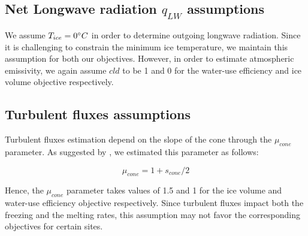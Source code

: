 \subsection{Net Longwave radiation \texorpdfstring{$q_{LW}$}{Lg} assumptions} 

We assume $T_{ice} = 0 ^{\circ} C$ in order to determine outgoing longwave radiation. Since it is challenging to
constrain the minimum ice temperature, we maintain this assumption for both our objectives. However, in order to
estimate atmospheric emissivity, we again assume $cld$ to be 1 and 0 for the water-use efficiency and ice volume
objective respectively.

\subsection{Turbulent fluxes assumptions} 

Turbulent fluxes estimation depend on the slope of the cone through the $\mu_{cone}$ parameter. As suggested 
by \citet{oerlemansBriefCommunicationGrowth2021}, we estimated this parameter as follows:

\begin{equation}
  \mu_{cone} =1 + s_{cone}/2
\end{equation}

Hence, the $\mu_{cone}$ parameter takes values of 1.5 and 1 for the ice volume and water-use efficiency
objective respectively.  Since turbulent fluxes impact both the freezing and the melting rates, this assumption
may not favor the corresponding objectives for certain sites.


